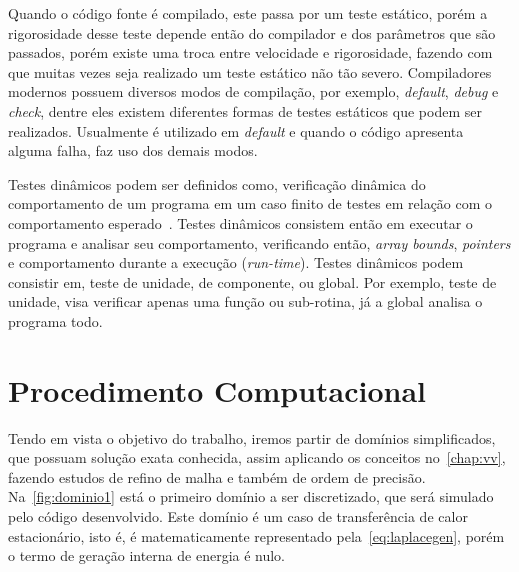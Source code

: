 \documentclass[
	12pt,				  %
	openright,		%
	twoside,			%
	a4paper,			%
	chapter=TITLE,		    %
	english,			%
	brazil				%
	]{abntex2}
\begin{document}
Quando o código fonte é compilado, este passa por um teste estático, porém a
rigorosidade desse teste depende então do compilador e dos parâmetros que são
passados, porém existe uma troca entre velocidade e rigorosidade, fazendo com
que muitas vezes seja realizado um teste estático não tão severo.
Compiladores modernos possuem diversos modos de compilação, por exemplo,
\textit{default}, \textit{debug} e \textit{check}, dentre eles existem
diferentes formas de testes estáticos que podem ser realizados. Usualmente é
utilizado em \textit{default} e quando o código apresenta alguma falha, faz uso
dos demais modos. 

Testes dinâmicos podem ser definidos como, verificação dinâmica do comportamento
de um programa em um caso finito de testes em relação com o comportamento
esperado~\cite{swebokv3}. Testes dinâmicos consistem então em executar o programa
e analisar seu comportamento, verificando então, \textit{array bounds},
\textit{pointers} e comportamento durante a execução (\textit{run-time}).
Testes dinâmicos podem consistir em, teste de unidade, de componente, ou
global. Por exemplo, teste de unidade, visa verificar apenas uma função ou
sub-rotina, já a global analisa o programa todo.




\section{Procedimento Computacional}\label{chap:proccomp}

Tendo em vista o objetivo do trabalho, iremos partir de domínios simplificados,
que possuam solução exata conhecida, assim aplicando os conceitos
no~\autoref{chap:vv}, fazendo estudos de refino de malha e também de ordem de
precisão. Na~\autoref{fig:dominio1} está o primeiro domínio a ser discretizado,
que será simulado pelo código desenvolvido. Este domínio é um caso de
transferência de calor estacionário, isto é, é matematicamente representado
pela~\autoref{eq:laplacegen}, porém o termo de geração interna de energia é
nulo.
\end{document}
